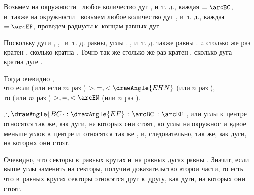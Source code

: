 \documentclass[letters,booklanguage=russian]{byrnebook}
\begin{document}
Возьмем на окружности \circleG\ любое количество дуг
,
 и~т. д., каждая $= \arcBC$, и~также на окружности \circleH\ возьмем любое количество дуг
,
 и~т. д., каждая $= \arcEF$, проведем радиусы к~концам равных дуг.

Поскольку дуги \arcBC, \arcCK, \arcKL\ и~т. д. равны, углы , ,  и~т. д. также равны . $\therefore$  столько же раз кратен , сколько  кратна \arcBC. Точно так же  столько же раз кратен , сколько дуга  кратна дуге \arcEF.

\begin{center}
Тогда очевидно ,\\
что если  (или если $m$ раз ) $>, =, < \drawAngle{EHN}$ (или $n$ раз ),\\
то \arcBL (или $m$ раз \arcBC) $>, =, < \arcEN$ (или $n$ раз \arcEF).
\end{center}

$\therefore \drawAngle{BC} : \drawAngle{EF} :: \arcBC\ : \arcEF$ , или углы в~центре относятся так же, как дуги, на которых они стоят, но углы на окружности вдвое меньше углов в~центре  и~относятся так же , и, следовательно, так же, как дуги, на которых они стоят.

Очевидно, что секторы в~равных кругах и~на равных дугах равны . Значит, если выше углы заменить на секторы, получим доказательство второй части, то есть что в~равных кругах секторы относятся друг к~другу, как дуги, на которых они стоят.
\end{document}
